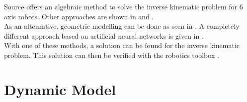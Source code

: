 Source \cite{invKinSolYanWu} 
offers an algebraic method to solve the inverse kinematic problem for 6 axis robots.
Other approaches are shown in %
\cite{FwdInvAnalysRobManip} and %
\cite{FwInvKuka}. \\

As an alternative, geometric modelling can be done as seen in %
\cite{geomModelingKamel}. 
A completely different approach based on artificial neural networks is given in %
\cite{invKinANNKSHITISH}.\\
%
%
With one of these methods, a solution can be found for the inverse kinematic problem.
This solution can then be verified with the robotics toolbox %
\cite{CorkeRoboticsToolbox}.
\medskip

\section{Dynamic Model}

